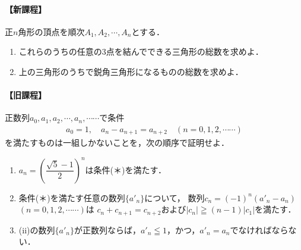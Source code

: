 \documentclass[../../main.tex]{subfiles}
\begin{document}
\paragraph{【新課程】}
正$n$角形の頂点を順次$A_1,A_2,\cdots,A_n$とする．
\begin{enumerate}
  \item これらのうちの任意の3点を結んでできる三角形の総数を求めよ．
  \item 上の三角形のうちで鋭角三角形になるものの総数を求めよ．
\end{enumerate}

\paragraph{【旧課程】}
正数列$a_0,a_1,a_2,\cdots,a_n,\cdots\cdots$で条件
\begin{align}
  a_0=1, \quad a_n-a_{n+1}=a_{n+2} \quad (n=0,1,2,\cdots\cdots) \tag{＊}
\end{align}
を満たすものは一組しかないことを，次の順序で証明せよ．
\begin{enumerate}
  \item[(i)] $a_n=\left( \dfrac{\sqrt{5}-1}{2} \right)^n$は条件(＊)を満たす．
  \item[(ii)] 条件(＊)を満たす任意の数列$\{ {a'}_n \}$について，
    数列$c_n=(-1)^n({a'}_n-a_n)$ $(n=0,1,2,\cdots\cdots)$は
    $c_n+c_{n+1}=c_{n+2}$および$|c_n|\geqq(n-1)|c_1|$を満たす．
  \item[(iii)] (ii)の数列$\{ {a'}_n \}$が正数列ならば，${a'}_n\leqq1$，かつ，${a'}_n=a_n$でなければならない．
\end{enumerate}
\end{document}
